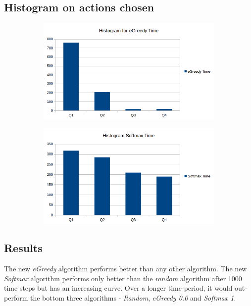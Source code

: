 \documentclass[a4paper, 11pt]{article}
\begin{document}
\subsection{Histogram on actions chosen}

\begin{figure}[H]
\centering
\begin{subfigure}{.5\textwidth}
  \centering
  \includegraphics[width=1\linewidth]{ex1_3_histogram_egreedytime}
\end{subfigure}%
\begin{subfigure}{.5\textwidth}
  \centering
  \includegraphics[width=1\linewidth]{ex1_3_histogram_softmaxtime}
\end{subfigure}%
\end{figure}

\subsection{Results}

The new \textit{eGreedy} algorithm performs better than any other algorithm. The new \textit{Softmax} algorithm performs only better than the \textit{random} algorithm after 1000 time steps but has an increasing curve. Over a longer time-period, it would out-perform the bottom three algorithms - \textit{Random}, \textit{eGreedy 0.0} and \textit{Softmax 1}.
\end{document}
